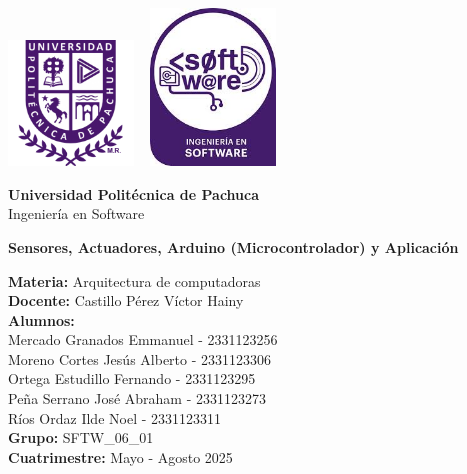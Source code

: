 \documentclass[a4paper,12pt]{article}
\begin{document}
	\begin{titlepage}
		\centering
		\includegraphics[width=0.25\textwidth]{logoUpp} \hspace{7cm} 
		\includegraphics[width=0.25\textwidth]{logoSftw}
		\vspace{2cm}
		
		\Huge \textbf{Universidad Politécnica de Pachuca}\\
		\vspace{0.5cm}
		\Large Ingeniería en Software
		\vspace{1cm}
		
		\Huge \textbf{Sensores, Actuadores, Arduino (Microcontrolador) y Aplicación}
		\vspace{1cm}
		
		\Large \textbf{Materia:} Arquitectura de computadoras \\
		\Large \textbf{Docente:} Castillo Pérez Víctor Hainy\\
		\vspace{1cm}
		\Large \textbf{Alumnos:} \\
		Mercado Granados Emmanuel - 2331123256\\
		Moreno Cortes Jesús Alberto - 2331123306\\
		Ortega Estudillo Fernando - 2331123295\\
		Peña Serrano José Abraham - 2331123273\\
		Ríos Ordaz Ilde Noel - 2331123311\\
		\vspace{1cm}
		\Large \textbf{Grupo:} SFTW\_06\_01\\
		\vspace{1cm}
		\Large \textbf{Cuatrimestre:} Mayo - Agosto 2025
		
	\end{titlepage}
	
\end{document}
